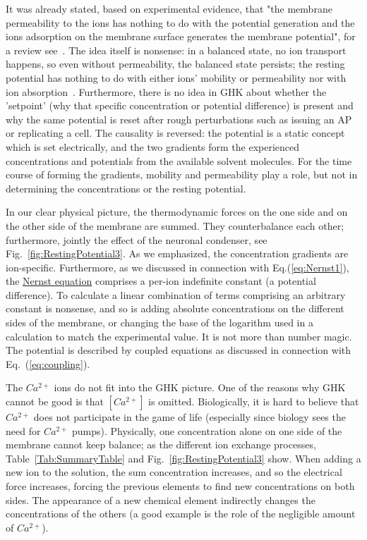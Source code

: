 It was already stated, based on experimental evidence, that "the membrane permeability to the ions has nothing to do with the potential generation and the ions adsorption on the membrane surface generates the membrane potential", for a review see~\cite{MembranePotentialPermeability:2024}.
The idea itself is nonsense: in a balanced state, no ion transport happens, so even without permeability, the balanced state persists;  the resting potential has nothing to do with either ions' mobility or permeability nor with ion absorption~\cite{Hodgkin-HuxleyAdsorption:2021}.
Furthermore, there is no idea in \gls{GHK} about whether the 'setpoint' (why that specific concentration or potential difference) is present and why the same potential is reset after rough perturbations such as issuing an \gls{AP} or replicating a cell.
The causality is reversed: the potential is a static concept which is set electrically, and
the two gradients form the experienced concentrations and potentials from the available solvent molecules.
For the time course of forming the gradients, mobility and permeability play a role, but not in determining the concentrations or the resting potential.


In our clear physical picture, the thermodynamic forces on the one side
and on the other side of the membrane are summed. They counterbalance each other; furthermore, jointly the effect of the neuronal condenser, see  Fig.~\ref{fig:RestingPotential3}.
As we emphasized, the concentration gradients are ion-specific.
Furthermore, as we discussed in connection with Eq.(\ref{eq:Nernst1}), the \hyperlink{NernstLaw}{Nernst equation} comprises a per-ion indefinite constant (a potential difference).
To calculate a linear combination of terms comprising an arbitrary constant is nonsense,
and so is adding absolute concentrations on the different sides of the membrane, or changing the base of the logarithm used in a calculation to match
the experimental value. It is not more than number magic. The potential is described by coupled equations as discussed in connection with Eq.~(\ref{eq:coupling}).

The $Ca^{2+}$ ions do not fit into the \gls{GHK} picture. 
One of the reasons why \gls{GHK} cannot be good is that $[Ca^{2+}]$
is omitted. Biologically, it is hard to believe that $Ca^{2+}$ does not participate in the game of life (especially since biology sees the need for $Ca^{2+}$ pumps). Physically, one concentration alone on one side of the membrane cannot keep balance; as the different ion exchange processes, Table~\ref{Tab:SummaryTable} and Fig.~\ref{fig:RestingPotential3} show.
When adding a new ion to the solution, the sum concentration
increases, and so the electrical force increases, forcing the previous 
elements to find new concentrations on both sides.
The appearance of a new chemical element indirectly changes the concentrations of the others (a good example is the role of the negligible amount of $Ca^{2+}$).


